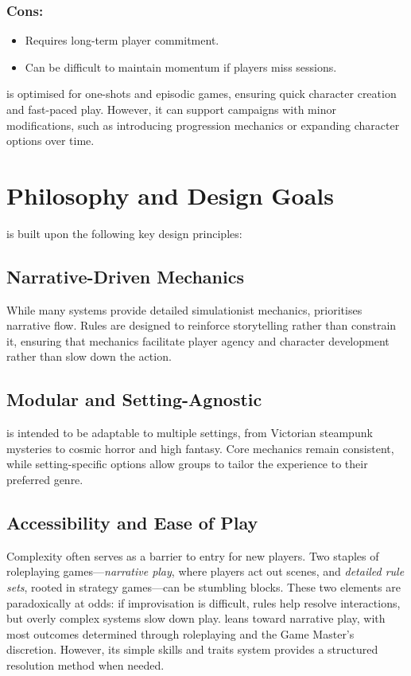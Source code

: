 \subsubsection{Cons:}
\begin{itemize}
    \item Requires long-term player commitment.
    \item Can be difficult to maintain momentum if players miss sessions.
\end{itemize}

\wyrd is optimised for one-shots and episodic games, ensuring quick character creation and fast-paced play. However, it can support campaigns with minor modifications, such as introducing progression mechanics or expanding character options over time.

\section{Philosophy and Design Goals}
\wyrd is built upon the following key design principles:

\subsection{Narrative-Driven Mechanics}
While many systems provide detailed simulationist mechanics, \wyrd prioritises narrative flow. Rules are designed to reinforce storytelling rather than constrain it, ensuring that mechanics facilitate player agency and character development rather than slow down the action.

\subsection{Modular and Setting-Agnostic}
\wyrd is intended to be adaptable to multiple settings, from Victorian steampunk mysteries to cosmic horror and high fantasy. Core mechanics remain consistent, while setting-specific options allow groups to tailor the experience to their preferred genre.

\subsection{Accessibility and Ease of Play}
Complexity often serves as a barrier to entry for new players. Two staples of roleplaying games—\emph{narrative play}, where players act out scenes, and \emph{detailed rule sets}, rooted in strategy games—can be stumbling blocks. These two elements are paradoxically at odds: if improvisation is difficult, rules help resolve interactions, but overly complex systems slow down play. \wyrd leans toward narrative play, with most outcomes determined through roleplaying and the Game Master's discretion. However, its simple skills and traits system provides a structured resolution method when needed.


